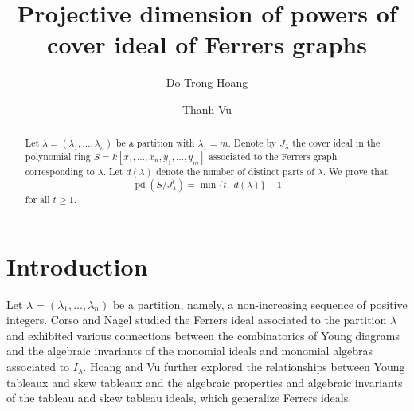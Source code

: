 \documentclass[12pt,amscd]{amsart}
\theoremstyle{definition}
\numberwithin{equation}{section}
\DeclareMathOperator{\pd}{pd}
\begin{document}
\title{Projective dimension of powers of cover ideal of Ferrers graphs}

\author{Do Trong Hoang}
\address{Faculty of Mathematics and Informatics, Hanoi University of Science and Technology, 1 Dai Co Viet, Bach Mai, Hanoi, Vietnam.}


 
\author{Thanh Vu}
\address{Institute of Mathematics, VAST, 18 Hoang Quoc Viet, Hanoi, Vietnam}



\date{}

 
\commby{}

\begin{abstract}
   Let $\lambda = (\lambda_1, \ldots, \lambda_n)$ be a partition with $\lambda_1 = m$. Denote by $J_\lambda$ the cover ideal in the polynomial ring
\(
S = k[x_1, \ldots, x_n, y_1, \ldots, y_m]
\)
associated to the Ferrers graph corresponding to $\lambda$. Let $d(\lambda)$ denote the number of distinct parts of $\lambda$. We prove that
\[
\pd(S/J_\lambda^t)
=
\min\{t,\; d(\lambda)\} + 1
\]
for all $t \ge 1$.
\end{abstract}

\maketitle


\section{Introduction}
\label{sect_intro}
Let $\lambda = (\lambda_1, \ldots, \lambda_n)$ be a partition, namely, a non-increasing sequence of positive integers. Corso and Nagel \cite{CN} studied the Ferrers ideal associated to the partition $\lambda$ and exhibited various connections between the combinatorics of Young diagrams and the algebraic invariants of the monomial ideals and monomial algebras associated to $I_\lambda$. Hoang and Vu \cite{HV1,HV2} further explored the relationships between Young tableaux and skew tableaux and the algebraic properties and algebraic invariants of the tableau and skew tableau ideals, which generalize Ferrers ideals. 
\end{document}
